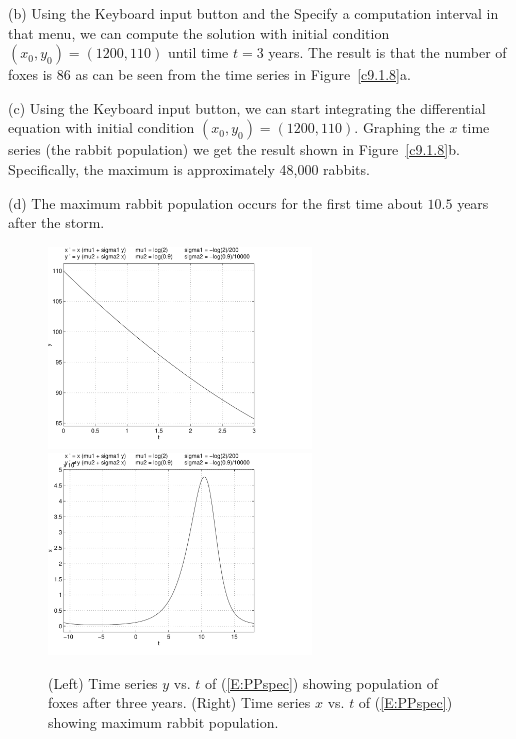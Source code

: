 \documentclass{ximera}
\begin{document}
\begin{computerExercise}
\begin{solution}
\noindent (b) Using the {\sf Keyboard input} button and the {\sf Specify a
computation interval} in that menu, we can compute the solution with initial
condition $(x_0,y_0)=(1200,110)$ until time $t=3$ years.  The result is that
the number of foxes is $86$ as can be seen from the time series in 
Figure~\ref{c9.1.8}a.

\noindent (c)  Using the {\sf Keyboard input} button, we can start
integrating the differential equation with initial condition
$(x_0,y_0)=(1200,110)$.  Graphing the $x$ time series (the rabbit population)
we get the result shown in Figure~\ref{c9.1.8}b.  Specifically, the 
maximum is approximately 48,000 rabbits. 

\noindent (d)  The maximum rabbit population occurs for the first time about 
$10.5$ years after the storm.

\begin{figure}[htb]
     \centerline{%
     \includegraphics[width=2.75in]{exfigure/PPinit2.pdf}
     \includegraphics[width=2.75in]{exfigure/PPinit.pdf}}
     \caption{(Left) Time series $y$ vs. $t$ of (\protect\ref{E:PPspec}) 
	showing population of foxes after three years. (Right) Time series $x$ 
	vs. $t$ of (\protect\ref{E:PPspec}) showing maximum rabbit population.}
\end{figure}


\end{solution}
\end{computerExercise}
\end{document}
